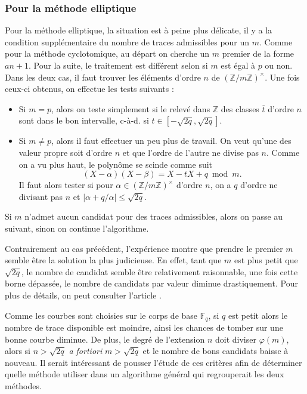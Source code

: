 \documentclass[a4paper]{article} %
\numberwithin{section}{part}
\numberwithin{equation}{section}
\newcommand\zmodninv[1]{(\mathbb{Z}/#1\mathbb{Z})^{\times}}
\newcommand\GF[1]{\mathbb{F}_{#1}}
\newcommand\ZZ{\mathbb{Z}}
\begin{document}
\subsubsection*{Pour la méthode elliptique}
\label{sec:recherchermell}
Pour la méthode elliptique, la situation est à peine plus délicate, il y a la
condition supplémentaire du nombre de traces admissibles pour un $m$. Comme pour
la méthode cyclotomique, au départ on cherche un $m$ premier de la forme 
$an + 1$.  Pour la suite, le traitement est différent selon si $m$ est égal à 
$p$ ou non. Dans les deux cas, il faut trouver les éléments d'ordre $n$ de 
$\zmodninv{m}$. Une fois ceux-ci obtenus, on effectue les tests suivants :
\vspace{0.3cm}
\begin{itemize}
    \item Si $m = p$, alors on teste simplement si le relevé dans $\ZZ$ des
    classes $\overline{t}$ d'ordre $n$ sont dans le bon intervalle, 
    c-à-d. si $t\in[-\sqrt{2q},\sqrt{2q}]$.\vspace{0.2cm}

    \item Si $m\neq p$, alors il faut effectuer un peu plus de travail. On
    veut qu'une des valeur propre soit d'ordre $n$ et que l'ordre de l'autre ne
	divise pas $n$.
    Comme on a vu plus haut, le polynôme se scinde comme suit 
    \[(X - \alpha)(X- \beta)= X -tX + q\bmod m.\] 
    Il faut alors tester si pour $\alpha\in\zmodninv{m}$ 
    d'ordre $n$, on a $q$ d'ordre ne divisant pas $n$ et 
    $\vert{\alpha + q/\alpha}\vert\leq\sqrt{2q}$.
\end{itemize}
\vspace{0.3cm}
Si $m$ n'admet aucun candidat pour des traces admissibles, alors on passe
au suivant, sinon on continue l'algorithme.

\begin{rem}
Contrairement au cas précédent, l'expérience montre que prendre le premier $m$ 
semble être la solution la plus judicieuse. En effet, tant que $m$ est plus 
petit que $\sqrt{2q}$, le nombre de candidat semble être relativement 
raisonnable, une fois cette borne dépassée, le nombre de candidats par valeur 
diminue drastiquement. Pour plus de détails, on peut consulter l'article 
\cite{CasHen}.\par
Comme les courbes sont choisies sur le corps de base $\GF{q}$, si $q$ est petit
alors le nombre de trace disponible est moindre, ainsi les chances de tomber sur
une bonne courbe diminue. De plus, le degré de l'extension $n$ doit diviser 
$\varphi(m)$, alors si $n > \sqrt{2q}$ \emph{a fortiori} $m >\sqrt{2q}$ et le 
nombre de bons candidats baisse à nouveau. Il serait intéressant de pousser 
l'étude de ces critères afin de déterminer quelle méthode utiliser dans un 
algorithme général qui regrouperait les deux méthodes.
\end{rem}
\end{document}
